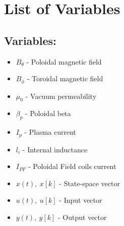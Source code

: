 \chapter*{List of Variables}
\begin{multicols}{2}
\section*{Variables:}
\begin{itemize}
\item $B_{\theta}$ - Poloidal magnetic field
\item $B_{\phi}$ - Toroidal magnetic field
\item $\mu_0$ - Vacuum permeability
\item $\beta_p$ - Poloidal beta
\item $I_p$ - Plasma current
\item $l_i$ - Internal inductance
\item $I_{PF}$ - Poloidal Field coils current
\item $x(t),~x[k]$ - State-space vector
\item $u(t),~u[k]$ - Input vector
\item $y(t),~y[k]$ - Output vector
\end{itemize}

\end{multicols}